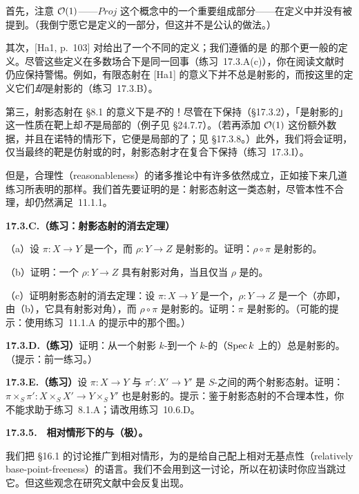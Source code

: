 首先，注意 $\mathcal{O}(1)$——$\mathit{Proj}$ 这个概念中的一个重要组成部分——在定义中并没有被提到。（我倒宁愿它是定义的一部分，但这并不是公认的做法。）

其次，[Ha1, p.~103] 对\trProjective\trMorphism{}给出了一个不同的定义；我们遵循的是 \trGrothendieck{}的那个更一般的定义。尽管这些定义在多数场合下是同一回事（\mbox{练习~17.3.A}(c)），你在阅读文献时仍应保持警惕。例如，有限态射在 [Ha1] 的意义下并不总是射影的，而按这里的定义它们\emph{却}是射影的（\mbox{练习~17.3.B}）。

第三，射影态射在 \S8.1 的意义下是\emph{不}\trReasonable{}的！尽管\trProjective\trMorphism{}在\trBaseChange{}下保持（\S17.3.2），「是射影的」这一性质在靶上却\emph{不}是局部的（例子见 \S24.7.7）。（若再添加\trInvertibleSheaf{} $\mathcal{O}(1)$ 这份额外数据，并且在诺特的情形下，它便是局部的了；见 \S17.3.8。）此外，我们将会证明，仅当最终的靶是仿射或\trNoetherian{}的时，射影态射才在复合下保持（\mbox{练习~17.3.I}）。

但是，合理性（reasonableness）的诸多推论中有许多依然成立，正如接下来几道练习所表明的那样。我们首先要证明的是：射影态射这一类态射，尽管本性不合理，却仍然满足\trCancellationTheorem~11.1.1。

\textbf{17.3.C.（练习：射影态射的消去定理）}

（a）设 $\pi\colon X\to Y$ 是一个\trClosedEmbedding，而 $\rho\colon Y\to Z$ 是射影的。证明：$\rho\circ\pi$ 是射影的。

（b）证明：一个\trMorphism{} $\rho\colon Y\to Z$ 具有射影对角，当且仅当 $\rho$ 是\trSeparated{}的。

（c）证明射影态射的消去定理：设 $\pi\colon X\to Y$ 是一个\trMorphism，$\rho\colon Y\to Z$ 是一个\trSeparated\trMorphism（亦即，由（b），它具有射影对角），而 $\rho\circ\pi$ 是射影的。证明：$\pi$ 是射影的。（可能的提示：使用\mbox{练习~11.1.A} 的提示中的那个图。）

\textbf{17.3.D.（练习）}\quad 证明：从一个射影 $k$-\trScheme{}到一个\trSeparated{} $k$-\trScheme{}的（$\operatorname{Spec} k$ 上的）\trMorphism{}总是射影的。（提示：前一练习。）

\textbf{17.3.E.（练习）}\quad 设 $\pi\colon X\to Y$ 与 $\pi'\colon X'\to Y'$ 是 $S$-\trScheme{}之间的两个射影态射。证明：$\pi\times_S\pi'\colon X\times_S X'\to Y\times_S Y'$ 也是射影的。提示：鉴于射影态射的不合理本性，你不能求助于\mbox{练习~8.1.A}；请改用\mbox{练习~10.6.D}。

\textbf{17.3.5.}\ \hard\ \textbf{相对情形下的\trGlobalGeneration{}与（极）\trAmpleness。}

我们把 \S16.1 的讨论推广到相对情形，为的是给自己配上相对无基点性（relatively base-point-freeness）的语言。我们不会用到这一讨论，所以在初读时你应当跳过它。但这些观念在研究文献中会反复出现。

